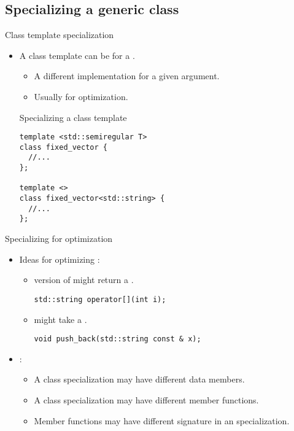 \subsection{Specializing a generic class}

\begin{frame}[t,fragile]{Class template specialization}
\begin{itemize}
  \item A class template can be  for a .
    \begin{itemize}
      \item A different implementation for a given argument.
      \item Usually for optimization.
    \end{itemize}

\begin{block}{Specializing a class template}
\begin{lstlisting}
template <std::semiregular T>
class fixed_vector {
  //...
};

template <>
class fixed_vector<std::string> {
  //...
};
\end{lstlisting}
\end{block}

\end{itemize}
\end{frame}


\begin{frame}[t,fragile]{Specializing for optimization}
\begin{itemize}
  \item Ideas for optimizing :
    \begin{itemize}
      \item {} version of  might return a .
\begin{lstlisting}
std::string operator[](int i);
\end{lstlisting}
      \item {} might take a .
\begin{lstlisting}
void push_back(std::string const & x);
\end{lstlisting}
    \end{itemize}

  \item {}:
    \begin{itemize}
      \item A class specialization may have different data members.
      \item A class specialization may have different member functions.
      \item Member functions may have different signature in an specialization.
    \end{itemize}
\end{itemize}
\end{frame}


